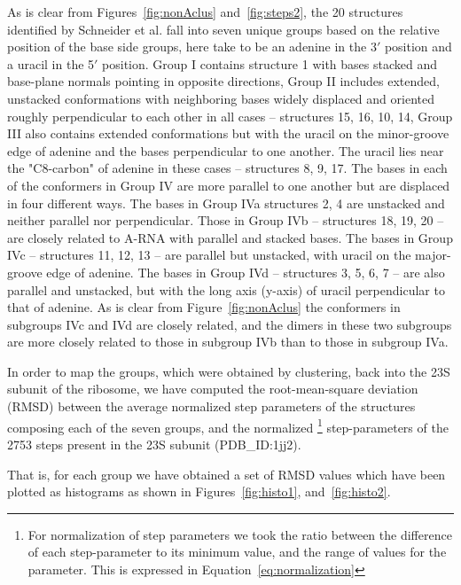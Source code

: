 As is clear  from Figures~\ref{fig:nonAclus} and~\ref{fig:steps2}, the
20 structures  identified by Schneider  et al. fall into  seven unique
groups based  on the relative position  of the base  side groups, here
take to be  an adenine in the  3$'$ position and a uracil  in the 5$'$
position.   Group I  contains  structure {1}  with  bases stacked  and
base-plane normals pointing in  opposite directions, Group II includes
extended,  unstacked  conformations   with  neighboring  bases  widely
displaced  and oriented  roughly perpendicular  to each  other  in all
cases -- structures {15, 16, 10, 14}, Group III also contains extended
conformations but with the uracil  on the minor-groove edge of adenine
and the bases  perpendicular to one another. The  uracil lies near the
"C8-carbon" of  adenine in these cases  -- structures {8,  9, 17}. The
bases in each  of the conformers in Group IV are  more parallel to one
another but are displaced in  four different ways.  The bases in Group
IVa  structures  {2,  4}   are  unstacked  and  neither  parallel  nor
perpendicular.  Those in  Group IVb -- structures {18,  19, 20} -- are
closely related to A-RNA with parallel and stacked bases. The bases in
Group IVc  -- structures {11, 12,  13} -- are  parallel but unstacked,
with uracil on  the major-groove edge of adenine.   The bases in Group
IVd -- structures {3, 5, 6, 7} -- are also parallel and unstacked, but
with  the  long axis  (y-axis)  of  uracil  perpendicular to  that  of
adenine.  As is clear from Figure~\ref{fig:nonAclus} the conformers in
subgroups IVc and IVd are closely related, and the dimers in these two
subgroups are more closely related to  those in subgroup  IVb than to
those in subgroup IVa.

In order  to map  the groups, which  were obtained by  clustering, back
into  the  23S   subunit  of  the  ribosome,  we   have  computed  the
root-mean-square deviation (RMSD)  between the average normalized step
parameters of the  structures composing each of the  seven groups, and
the normalized \footnote{For normalization  of step parameters we took
  the  ratio between  the  difference of  each  step-parameter to  its
  minimum value, and the range of values for the parameter. This is
  expressed in Equation~\ref{eq:normalization}} step-parameters of the
2753 steps present in the 23S subunit (PDB\_ID:1jj2).

That  is, for
each  group we  have obtained  a set  of RMSD  values which  have been
plotted   as   histograms   as  shown   in   Figures~\ref{fig:histo1},
and~\ref{fig:histo2}.

